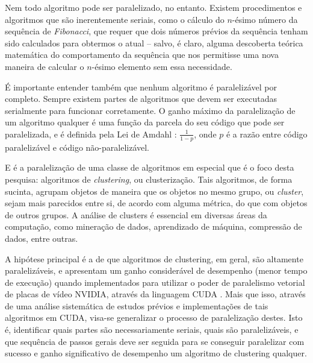 \documentclass[12pt, %
openright, 
oneside, %
a4paper,    %
brazil]{facom-ufu-abntex2}
\begin{document}


Nem todo algoritmo pode ser paralelizado, no entanto. Existem procedimentos e algoritmos que são inerentemente seriais, como o cálculo do $n$-ésimo número da sequência de \textit{Fibonacci}, que requer que dois números prévios da sequência tenham sido calculados para obtermos o atual -- salvo, é claro, alguma descoberta teórica matemática do comportamento da sequência que nos permitisse uma nova maneira de calcular o $n$-ésimo elemento sem essa necessidade.

É importante entender também que nenhum algoritmo é paralelizável por completo. Sempre existem partes de algoritmos que devem ser executadas serialmente para funcionar corretamente. O ganho máximo da paralelização de um algoritmo qualquer é uma função da parcela do seu código que pode ser paralelizada, e é definida pela Lei de Amdahl \cite{Amdahl-Law}: $\frac{1}{1-p}$, onde $p$ é a razão entre código paralelizável e código não-paralelizável.

E é a paralelização de uma classe de algoritmos em especial que é o foco desta pesquisa: algoritmos de \textit{clustering}, ou clusterização. Tais algoritmos, de forma sucinta, agrupam objetos de maneira que os objetos no mesmo grupo, ou \textit{cluster}, sejam mais parecidos entre si, de acordo com alguma métrica, do que com objetos de outros grupos. A análise de clusters é essencial em diversas áreas da computação, como mineração de dados, aprendizado de máquina, compressão de dados, entre outras.


A hipótese principal é a de que algoritmos de clustering, em geral, são altamente paralelizáveis, e apresentam um ganho considerável de desempenho (menor tempo de execução) quando implementados para utilizar o poder de paralelismo vetorial de placas de vídeo NVIDIA, através da linguagem CUDA \cite{CUDAZone}. Mais que isso, através de uma análise sistemática de estudos prévios e implementações de tais algoritmos em CUDA, visa-se generalizar o processo de paralelização destes. Isto é, identificar quais partes são necessariamente seriais, quais são paralelizáveis, e que sequência de passos gerais deve ser seguida para se conseguir paralelizar com sucesso e ganho significativo de desempenho um algoritmo de clustering qualquer.
\end{document}
